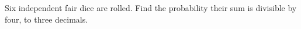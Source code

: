 Six independent fair dice are rolled. Find the probability their sum is divisible by four, to three decimals.
